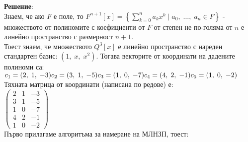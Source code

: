 \documentclass[12pt]{article}
\begin{document}
\textbf{Решение}: \\

Знаем, че ако $F$ е поле, то
$F^{n + 1}[x] = \left\{\displaystyle\sum_{k = 0}^n a_kx^k \; | \; a_0, \; \dots, \; a_n \in F  \right\}$
- множеството от полиномите с коефициенти от $F$ от степен не по-голяма от $n$ е линейно пространство с размерност $n + 1$. \\

Тоест знаем, че множеството $Q^3[x]$ е линейно пространство с нареден стандартен базис: $(1, \; x, \; x^2)$.
Тогава векторите от координати на дадените полиноми са: \\

$c_1 = (2, \; 1, \; -3) \\
c_2 = (3, \; 1, \; -5) \\
c_3 = (1, \; 0, \; -7) \\
c_4 = (4, \; 2, \; -1) \\
c_5 = (1, \; 0, \; -2)$ \\

Тяхната матрица от координати (написана по редове) е: \\

$\begin{pmatrix}
    2 & 1 & -3 \\
    3 & 1 & -5 \\
    1 & 0 & -7 \\
    4 & 2 & -1 \\
    1 & 0 & -2
\end{pmatrix}$ \\

Първо прилагаме алгоритъма за намеране на МЛНЗП, тоест: \\
\end{document}
